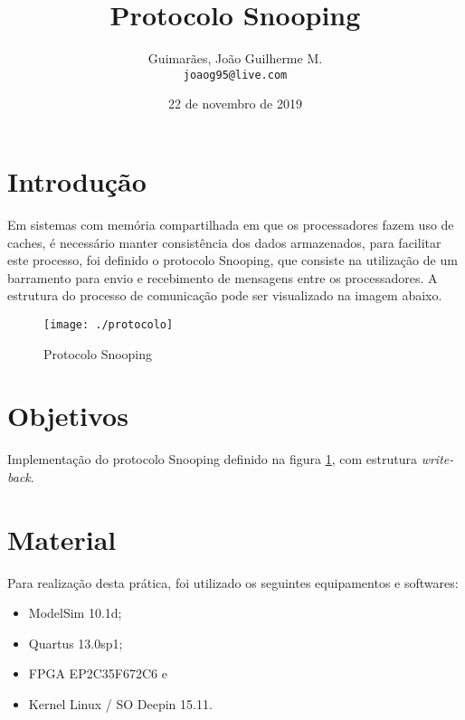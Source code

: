 \documentclass[12pt, a4paper]{article}
\title{\textbf{Protocolo Snooping}}
\author{
	Guimarães, João Guilherme M.\\
	\texttt{joaog95@live.com}
}
\date{22 de novembro de 2019}
\begin{document}
	\maketitle
	
	\vspace{1.5cm}
	
	\section{Introdução}
	
	\par Em sistemas com memória compartilhada em que os processadores fazem uso de caches, é necessário manter consistência dos dados armazenados, para facilitar este processo, foi definido o protocolo Snooping, que consiste na utilização de um barramento para envio e recebimento de mensagens entre os processadores. A estrutura do processo de comunicação pode ser visualizado na imagem abaixo.
	
	\vspace{\baselineskip}
	
	\begin{figure}[H]
		\centering
		\texttt{[image: ./protocolo]}
		\caption{Protocolo Snooping}
		\label{fig: protocolo Snooping}
	\end{figure}
	
	\section{Objetivos}
	
	\par Implementação do protocolo Snooping definido na figura \ref{fig: protocolo Snooping}, com estrutura \textit{write-back}.
	
	\section{Material}
	
	\par Para realização desta prática, foi utilizado os seguintes equipamentos e softwares:
	
	\begin{itemize}
		\item ModelSim 10.1d;
		\item Quartus 13.0sp1;
		\item FPGA EP2C35F672C6 e
		\item Kernel Linux / SO Deepin 15.11.
	\end{itemize}
	
\end{document}
